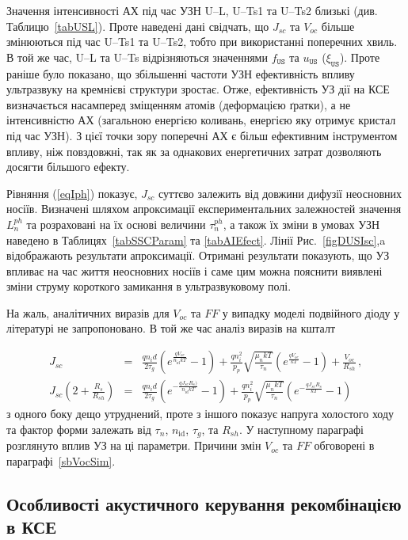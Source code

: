 Значення інтенсивності АХ під час УЗН U--L, U--Ts1 та U--Ts2 близькі (див. Таблицю~\ref{tabUSL}).
Проте наведені дані свідчать, що $J_{sc}$ та $V_{oc}$ більше змінюються під час U--Ts1 та U--Ts2, тобто при використанні поперечних хвиль.
В той же час, U--L та U--Ts відрізняються значеннями $f_\mathtt{US}$ та $u_\mathtt{US}$ ($\xi_\mathtt{US}$).
Проте раніше \cite{Olikh:FTP2011,Olikh:Ultras2016} було показано, що збільшенні частоти УЗН ефективність впливу ультразвуку
на кремнієві структури зростає.
Отже, ефективність УЗ дії на КСЕ визначається насамперед зміщенням атомів (деформацією ґратки),
а не інтенсивністю АХ (загальною енергією коливань, енергією яку отримує кристал під час УЗН).
З цієї точки зору поперечні АХ є більш ефективним інструментом впливу, ніж повздовжні,
так як за однакових енергетичних затрат дозволяють досягти більшого ефекту.

Рівняння (\ref{eqIph}) показує, $J_{sc}$ суттєво залежить від довжини дифузії неосновних носіїв.
Визначені шляхом апроксимації експериментальних залежностей значення $L_n^{ph}$ та розраховані на їх основі величини $\tau_n^{ph}$,
а також їх зміни в умовах УЗН наведено в Таблицях~\ref{tabSSCParam} та \ref{tabAIEfect}.
Лінії Рис.~\ref{figDUSIsc},a відображають результати апроксимації.
Отримані результати показують, що УЗ впливає на час життя неосновних носіїв і саме цим можна пояснити виявлені зміни струму короткого замикання в ультразвуковому полі.

На жаль, аналітичних виразів для $V_{oc}$ та $F\!F$ у випадку моделі подвійного діоду у літературі не запропоновано.
В той же час аналіз виразів на кшталт

\begin{eqnarray}
\label{eqSSCVoc}
 J_{sc}&=&\frac{qn_id}{2\tau_{g}}\left(e^{\frac{qV_{oc}}{n_\mathrm{id}kT}}-1\right)
+\frac{qn_i^2}{p_p}\sqrt{\frac{\mu_nkT}{\tau_n}}\left(e^{\frac{qV_{oc}}{kT}}-1\right)+\frac{V_{oc}}{R_{sh}}\,,\\
J_{sc}\left(2+\frac{R_s}{R_{sh}}\right)&=&\frac{qn_id}{2\tau_{g}}\left(e^{-\frac{qJ_{sc}R_s)}{n_\mathrm{id}kT}}-1\right)
+\frac{qn_i^2}{p_p}\sqrt{\frac{\mu_nkT}{\tau_n}}\left(e^{-\frac{qJ_{sc}R_s}{kT}}-1\right)
\end{eqnarray}
з одного боку дещо утруднений, проте з іншого показує напруга холостого ходу та фактор форми
залежать від $\tau_n$, $n_\mathrm{id}$, $\tau_g$, та $R_{sh}$.
У наступному параграфі розглянуто вплив УЗ на ці параметри.
Причини змін $V_{oc}$ та  $F\!F$ обговорені в параграфі~\ref{sbVocSim}.


\subsection{Особливості акустичного керування рекомбінацією в КСЕ\label{sbQNR}}

